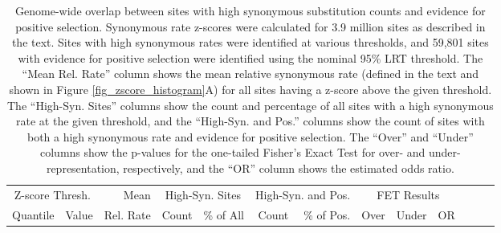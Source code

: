\begin{table}
\centering \footnotesize
\begin{tabular}{rrrrrrrrrrrrr}
\toprule
 \multicolumn{2}{c}{Z-score Thresh.} & Mean & \multicolumn{2}{c}{High-Syn. Sites} & \multicolumn{2}{c}{High-Syn. and Pos.} & \multicolumn{3}{c}{FET Results} \\
\cmidrule(r){1-2} \cmidrule(r){4-5} \cmidrule(r){6-7} \cmidrule(r){8-10}
Quantile & Value & Rel. Rate & Count & \% of All & Count & \% of Pos. & Over & Under & OR \\
  \midrule

\bottomrule
\end{tabular}
\caption{Genome-wide overlap between sites with high synonymous
  substitution counts and evidence for positive selection. Synonymous
  rate z-scores were calculated for 3.9 million sites as described in
  the text. Sites with high synonymous rates were identified at
  various thresholds, and 59,801 sites with evidence for positive
  selection were identified using the nominal 95\% LRT threshold. The
  ``Mean Rel. Rate'' column shows the mean relative synonymous rate
  (defined in the text and shown in Figure
  \ref{fig_zscore_histogram}A) for all sites having a z-score above
  the given threshold. The ``High-Syn. Sites'' columns show the count
  and percentage of all sites with a high synonymous rate at the given
  threshold, and the ``High-Syn. and Pos.''  columns show the count of
  sites with both a high synonymous rate and evidence for positive
  selection. The ``Over'' and ``Under'' columns show the p-values for the
  one-tailed Fisher's Exact Test for over- and under-representation,
  respectively, and the ``OR'' column shows the estimated odds ratio.}
\label{table_zscore_tests}
\end{table}


